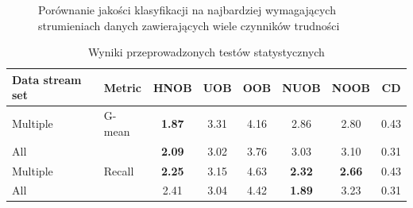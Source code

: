 \begin{figure}[h]
    \centering
    \qquad
    \caption{Porównanie jakości klasyfikacji na najbardziej wymagających strumieniach danych zawierających wiele czynników trudności}\label{Figure:ComplexComparisonHNOB}
\end{figure}

\begin{table}[ht]
\centering\small%
\setlength{\tabcolsep}{10pt} 
\renewcommand{\arraystretch}{1.5} 
\begin{tabular}{l l c c c c c c}
\toprule
Data stream set & Metric & HNOB & UOB & OOB & NUOB & NOOB & CD \\
\midrule
Multiple & G-mean & \textbf{1.87} & 3.31 & 4.16 & 2.86 & 2.80 & 0.43 \\
All  & & \textbf{2.09} & 3.02 & 3.76 & 3.03 & 3.10 & 0.31 \\
Multiple & Recall & \textbf{2.25} & 3.15 & 4.63 & \textbf{2.32} & \textbf{2.66} & 0.43\\
All  & & 2.41 & 3.04 & 4.42 & \textbf{1.89} & 3.23 & 0.31 \\
\bottomrule
\end{tabular}
\caption{Wyniki przeprowadzonych testów statystycznych}\label{Tab:ComplexFriedmanHNOB}
\end{table}

